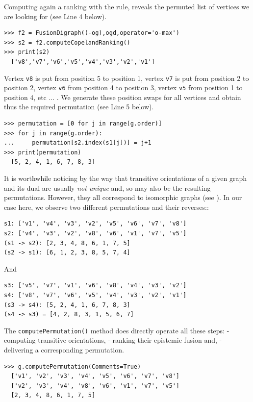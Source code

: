 Computing again a ranking with the \Copeland rule, reveals the permuted list of vertices we are looking for (see Line 4 below).
\begin{lstlisting}
>>> f2 = FusionDigraph((-og),ogd,operator='o-max')
>>> s2 = f2.computeCopelandRanking()
>>> print(s2)
  ['v8','v7','v6','v5','v4','v3','v2','v1']
\end{lstlisting}
Vertex \texttt{v8} is put from position 5 to position 1, vertex \texttt{v7} is put from position 2 to position 2, vertex \texttt{v6} from position 4 to position 3, vertex \texttt{v5} from position 1 to position 4, etc ... . We generate these position swaps for all vertices and obtain thus the required permutation (see Line 5 below).
\begin{lstlisting}
>>> permutation = [0 for j in range(g.order)]
>>> for j in range(g.order):
...     permutation[s2.index(s1[j])] = j+1
>>> print(permutation)
  [5, 2, 4, 1, 6, 7, 8, 3]
\end{lstlisting}

It is worthwhile noticing by the way that transitive orientations of a given graph and its dual are usually \emph{not unique} and, so may also be the resulting permutations. However, they all correspond to isomorphic graphs (see \citep{GOL-2004}). In our case here, we observe two different permutations and their reverses::
\begin{lstlisting}
s1: ['v1', 'v4', 'v3', 'v2', 'v5', 'v6', 'v7', 'v8']
s2: ['v4', 'v3', 'v2', 'v8', 'v6', 'v1', 'v7', 'v5']
(s1 -> s2): [2, 3, 4, 8, 6, 1, 7, 5]
(s2 -> s1): [6, 1, 2, 3, 8, 5, 7, 4]
\end{lstlisting}
And
\begin{lstlisting}  
s3: ['v5', 'v7', 'v1', 'v6', 'v8', 'v4', 'v3', 'v2']
s4: ['v8', 'v7', 'v6', 'v5', 'v4', 'v3', 'v2', 'v1']
(s3 -> s4): [5, 2, 4, 1, 6, 7, 8, 3]
(s4 -> s3) = [4, 2, 8, 3, 1, 5, 6, 7]
\end{lstlisting}
The \texttt{computePermutation()} method does directly operate all these steps: - computing transitive orientations, - ranking their epistemic fusion and, - delivering a corresponding permutation.
\begin{lstlisting}  
>>> g.computePermutation(Comments=True)
  ['v1', 'v2', 'v3', 'v4', 'v5', 'v6', 'v7', 'v8']
  ['v2', 'v3', 'v4', 'v8', 'v6', 'v1', 'v7', 'v5']
  [2, 3, 4, 8, 6, 1, 7, 5]
\end{lstlisting}


